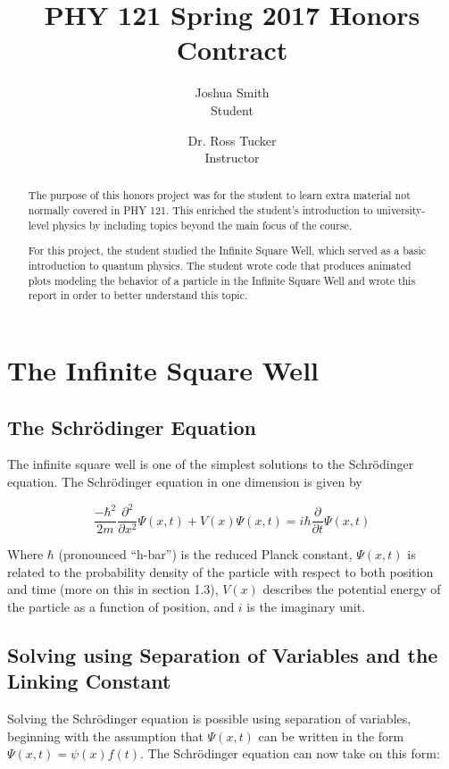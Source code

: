 \documentclass[11pt]{article}
\title{\textbf{PHY 121 Spring 2017 Honors Contract}}
\author{Joshua Smith\\
		Student \and
		Dr. Ross Tucker\\
		Instructor}
\date{}
\begin{document}
\maketitle

\begin{abstract}

The purpose of this honors project was for the student to learn extra material not normally covered in PHY 121. This enriched the student's introduction to university-level physics by including topics beyond the main focus of the course.

For this project, the student studied the Infinite Square Well, which served as a basic introduction to quantum physics. The student wrote code that produces animated plots modeling the behavior of a particle in the Infinite Square Well and wrote this report in order to better understand this topic.

\end{abstract}

\section{The Infinite Square Well}

\subsection{The Schr\"odinger Equation}

The infinite square well is one of the simplest solutions to the Schr\"odinger equation. The Schr\"odinger equation in one dimension is given by

$$
\frac{-\hbar^2}{2m}\frac{\partial^2}{\partial x^2} \Psi(x,t)+V(x)\Psi(x,t) = i\hbar \frac{\partial}{\partial t} \Psi(x,t)
$$

Where $\hbar$ (pronounced ``h-bar'') is the reduced Planck constant, $\Psi(x,t)$ is related to the probability density of the particle with respect to both position and time (more on this in section 1.3), $V(x)$ describes the potential energy of the particle as a function of position, and $i$ is the imaginary unit.

\subsection{Solving using Separation of Variables and the Linking Constant}

Solving the Schr\"odinger equation is possible using separation of variables, beginning with the assumption that $\Psi(x,t)$ can be written in the form $\Psi(x,t) = \psi(x)f(t)$. The Schr\"odinger equation can now take on this form:
\end{document}
